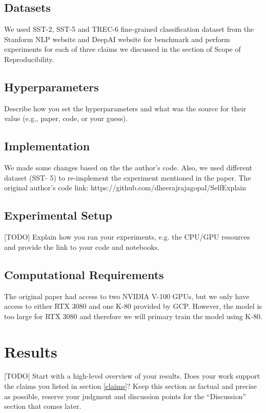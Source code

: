 \documentclass{article}
\begin{document}
\subsection{Datasets}

We used SST-2, SST-5 and TREC-6 fine-grained classification dataset from the Stanform NLP website and DeepAI website for 
benchmark and perform experiments for each of three claims we discussed in the section of 
Scope of Reproducibility.

\subsection{Hyperparameters}
Describe how you set the hyperparameters and what was the source for their value (e.g., paper, code, or your guess). 

\subsection{Implementation}

We made some changes based on the the author's code. Also, we used different dataset (SST- 5) to re-implement the experiment mentioned in the paper. The original author's code link: https://github.com/dheerajrajagopal/SelfExplain

\subsection{Experimental Setup}

[TODO] Explain how you ran your experiments, e.g. the CPU/GPU resources and provide the link to your code and notebooks. 

\subsection{Computational Requirements}

The original paper had access to two NVIDIA V-100 GPUs, but we only have access to either 
RTX 3080 and one K-80 provided by GCP. However, the model is too large for RTX 3080 and therefore we will 
primary train the model using K-80.

\section{Results}

[TODO] Start with a high-level overview of your results. Does your work support the claims you listed in section \ref{claims}? Keep this section as factual and precise as possible, reserve your judgment and discussion points for the ``Discussion'' section that comes later. 
\end{document}
